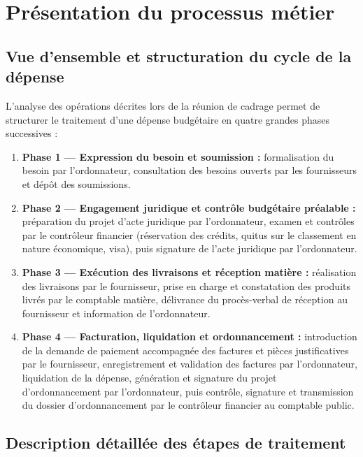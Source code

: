 \section{Présentation du processus métier}

\subsection{Vue d'ensemble et structuration du cycle de la dépense}

L'analyse des opérations décrites lors de la réunion de cadrage permet de structurer le traitement d'une dépense budgétaire en quatre grandes phases successives :

\begin{enumerate}
  \item \textbf{Phase 1 — Expression du besoin et soumission :} formalisation du besoin par l'ordonnateur, consultation des besoins ouverts par les fournisseurs et dépôt des soumissions.
  \item \textbf{Phase 2 — Engagement juridique et contrôle budgétaire préalable :} préparation du projet d'acte juridique par l'ordonnateur, examen et contrôles par le contrôleur financier (réservation des crédits, quitus sur le classement en nature économique, visa), puis signature de l'acte juridique par l'ordonnateur.
  \item \textbf{Phase 3 — Exécution des livraisons et réception matière :} réalisation des livraisons par le fournisseur, prise en charge et constatation des produits livrés par le comptable matière, délivrance du procès-verbal de réception au fournisseur et information de l'ordonnateur.
  \item \textbf{Phase 4 — Facturation, liquidation et ordonnancement :} introduction de la demande de paiement accompagnée des factures et pièces justificatives par le fournisseur, enregistrement et validation des factures par l'ordonnateur, liquidation de la dépense, génération et signature du projet d'ordonnancement par l'ordonnateur, puis contrôle, signature et transmission du dossier d'ordonnancement par le contrôleur financier au comptable public.
\end{enumerate}

\subsection{Description détaillée des étapes de traitement}

